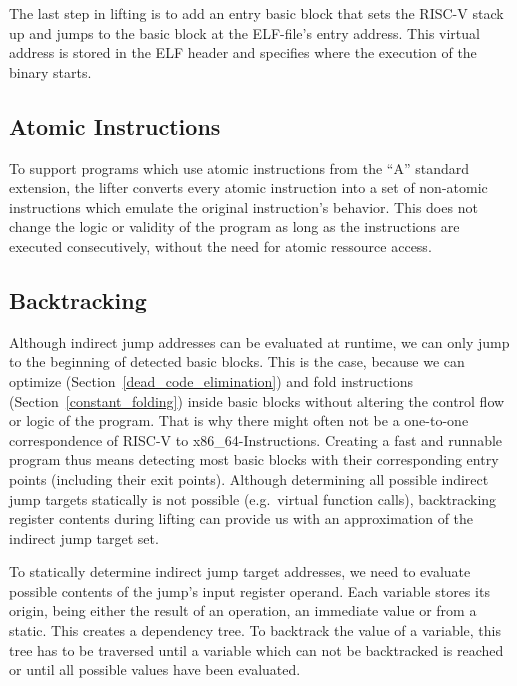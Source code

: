 \documentclass[course=eragp]{aspdoc}
\begin{document}
\par

The last step in lifting is to add an entry basic block that sets the RISC-V stack up and jumps to the
basic block at the ELF-file's entry address. This virtual address is stored in the ELF header
and specifies where the execution of the binary starts.\cite{elf_spec}

\subsection{Atomic Instructions}

To support programs which use atomic instructions from the ``A'' standard extension, the lifter converts
every atomic instruction into a set of non-atomic instructions which emulate the original
instruction's behavior. This does not change the logic or validity of the program as long as the
instructions are executed consecutively, without the need for atomic ressource access.


\subsection{Backtracking}\label{backtracking}
Although indirect jump addresses can be evaluated at runtime, we can only jump to the beginning of
detected basic blocks. This is the case, because we can optimize (Section~\ref{dead_code_elimination}) and fold
instructions (Section~\ref{constant_folding}) inside basic blocks without altering the control flow or
logic of the program. That is why there might often not be a one-to-one correspondence of RISC-V to x86\_64-Instructions.
Creating a fast and runnable program thus means detecting most basic blocks
with their corresponding entry points (including their exit points). Although determining all possible
indirect jump targets statically is not possible (e.g.\ virtual function calls),
backtracking register contents during lifting can provide us with
an approximation of the indirect jump target set.

\par

To statically determine indirect jump target addresses, we need to evaluate possible contents of
the jump's input register operand. Each variable stores its origin, being either the result of an
operation, an immediate value or from a static. This creates a dependency tree.
To backtrack the value of a variable, this tree has to be traversed until a variable which can not
be backtracked is reached or until all possible values have been evaluated.
\end{document}
